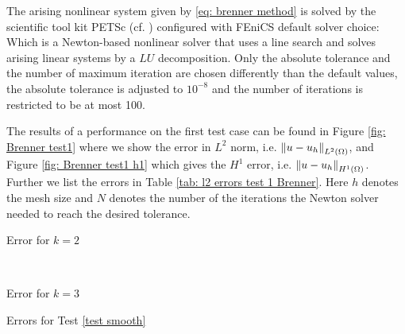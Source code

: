 The arising nonlinear system given by \eqref{eq: brenner method} is solved by the scientific tool kit PETSc (cf. \cite{petsc}) configured with FEniCS default solver choice: Which is a Newton-based nonlinear solver that uses a line search and solves arising linear systems by a $LU$ decomposition.
Only the absolute tolerance and the number of maximum iteration are chosen differently than the default values, the absolute tolerance is adjusted to $10^{-8}$ and the number of iterations is restricted to be at most 100. 

The results of a performance on the first test case can be found in Figure \ref{fig: Brenner test1} where we show the error in $L^2$ norm, i.e. $\left\lVert u-u_h \right\rVert_{L^2(\Omega)}$, and Figure \ref{fig: Brenner test1 h1} which gives the $H^1$ error, i.e. $\left\lVert u-u_h \right\rVert_{H^1(\Omega)}$. Further we list the errors in Table \ref{tab: l2 errors test 1 Brenner}. Here $h$ denotes the mesh size and $N$ denotes the number of the iterations the Newton solver needed to reach the desired tolerance. 

\begin{table}[H]
	\begin{subtable}[b]{0.45\textwidth}
		\centering
		\pgfplotstabletypeset[columns={iterations, l2error, h1error,N},
				    every row 0 column 0/.style={set content=init},
		]\MAOneBrennerTwo
    	\caption{Error for $k=2$}
   \end{subtable}
   ~
	\begin{subtable}[b]{0.45\textwidth}
		\centering
		\pgfplotstabletypeset[columns={iterations, l2error, h1error,N},
				    every row 0 column 0/.style={set content=init},
		]\MAOneBrennerThree
 	\caption{Error for $k=3$}
	\end{subtable}
	\caption{Errors for Test \ref{test smooth}}
	\label{tab: l2 errors test 1 Brenner}
\end{table}

